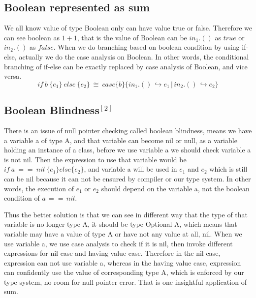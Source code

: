 \documentclass{article}
\begin{document}
\subsection*{Boolean represented as sum}
We all know value of type Boolean only can have value true or false. Therefore we can see boolean as $1+1$, that is the value of Boolean can be $in_{1}.()$ as $true$ or $in_{2}.()$ as $false$. When we do branching based on boolean condition by using if-else, actually we do the case analysis on Boolean. In other words, the conditional branching of if-else can be exactly replaced by case analysis of Boolean, and vice versa.
\begin{equation*}
if\ b\ \{e_{1}\}\ else\ \{e_{2}\}\ \cong\ case\{b\} \{in_{1}.()\,\hookrightarrow e_{1}\,|\,in_{2}.()\,\hookrightarrow e_{2}\}
\end{equation*}

\subsection*{Boolean Blindness$^{[2]}$}
There is an issue of null pointer checking called boolean blindness, means we have a variable a of type A, and that variable can become nil or null, as a variable holding an instance of a class, before we use variable a we should check variable a is not nil. Then the expression to use that variable would be
$if\ a\ ==\ nil\ \{ e_{1} \} else \{ e_{2} \} $, and variable a will be used in $e_{1}$ and $e_{2}$ which is still can be nil because it can not be ensured by compiler or our type system. In other words, the execution of $e_{1}$ or $e_{2}$ should depend on the variable a, not the boolean condition of $a\, ==\,nil$. 

Thus the better solution is that we can see in different way that the type of that variable is no longer type A, it should be type Optional A, which means that variable may have a value of type A or have not any value at all, nil. When we use variable a, we use case analysis to check if it is nil, then invoke different expressions for nil case and having value case. Therefore in the nil case, expression can not use variable a, whereas in the having value case, expression can confidently use the value of corresponding type A, which is enforced by our type system, no room for null pointer error. That is one insightful application of sum.
\end{document}
